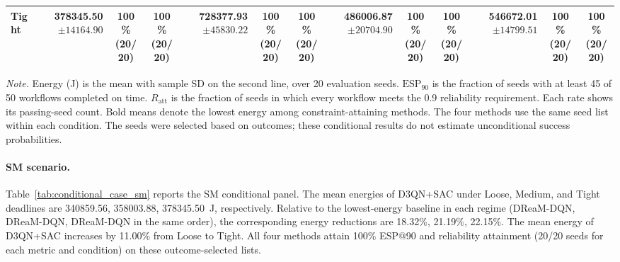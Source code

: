 \documentclass[10pt]{article}
\begin{document}
\begin{table}[!htbp]
\begin{tabular}{@{}l*{4}{rcc}@{}}
Tight & \shortstack[r]{\textbf{378345.50}\\$\pm 14164.90$} & \shortstack[c]{100\%\\(20/20)} & \shortstack[c]{100\%\\(20/20)} & \shortstack[r]{728377.93\\$\pm 45830.22$} & \shortstack[c]{100\%\\(20/20)} & \shortstack[c]{100\%\\(20/20)} & \shortstack[r]{486006.87\\$\pm 20704.90$} & \shortstack[c]{100\%\\(20/20)} & \shortstack[c]{100\%\\(20/20)} & \shortstack[r]{546672.01\\$\pm 14799.51$} & \shortstack[c]{100\%\\(20/20)} & \shortstack[c]{100\%\\(20/20)} \\
\bottomrule
\end{tabular}
\par\vspace{3pt}
\parbox{\textwidth}{\footnotesize
\textit{Note.} Energy (J) is the mean with sample SD on the second line, over 20 evaluation seeds.
$\mathrm{ESP}_{90}$ is the fraction of seeds with at least 45 of 50 workflows completed on time.
$R_{\mathrm{att}}$ is the fraction of seeds in which every workflow meets the 0.9 reliability requirement.
Each rate shows its passing-seed count. Bold means denote the lowest energy among constraint-attaining methods.
The four methods use the same seed list within each condition.
The seeds were selected based on outcomes; these conditional results do not estimate unconditional success probabilities.}
\endgroup
\end{table}

\paragraph{SM scenario.}
Table~\ref{tab:conditional_case_sm} reports the SM conditional panel. The mean energies of D3QN+SAC under Loose, Medium, and Tight deadlines are 340859.56, 358003.88, 378345.50~J, respectively. Relative to the lowest-energy baseline in each regime (DReaM-DQN, DReaM-DQN, DReaM-DQN in the same order), the corresponding energy reductions are 18.32\%, 21.19\%, 22.15\%. The mean energy of D3QN+SAC increases by 11.00\% from Loose to Tight. All four methods attain 100\% ESP@90 and reliability attainment (20/20 seeds for each metric and condition) on these outcome-selected lists.
\clearpage
\end{document}

